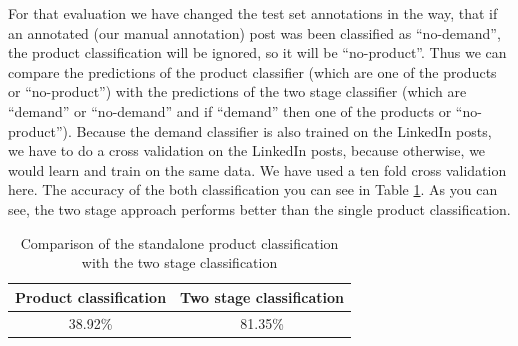 For that evaluation we have changed the test set annotations in the way, that if an annotated (our manual annotation) post was been classified as ``no-demand'', the product classification will be ignored, so it will be ``no-product''.
Thus we can compare the predictions of the product classifier (which are one of the products or ``no-product'') with the predictions of the two stage classifier (which are ``demand'' or ``no-demand'' and if ``demand'' then one of the products or ``no-product'').
Because the demand classifier is also trained on the LinkedIn posts, we have to do a cross validation on the LinkedIn posts, because otherwise, we would learn and train on the same data.
We have used a ten fold cross validation here.
The accuracy of the both classification you can see in Table \ref{table:two_stage_eval}.
As you can see, the two stage approach performs better than the single product classification.

\begin{table}
	\centering
	\begin{tabular}{c|c}
		\hline
		Product classification & Two stage classification \\ \hline \hline
		38.92\% & 81.35\% \\ \hline
	\end{tabular}
	\caption{Comparison of the standalone product classification with the two stage classification}
	\label{table:two_stage_eval}
\end{table}


